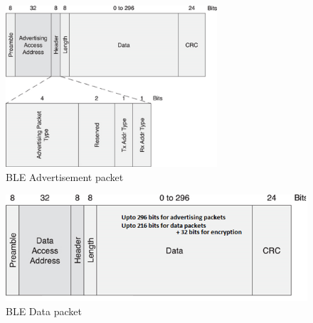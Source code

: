 \documentclass[]{article}
\begin{document}
\begin{figure}[htb]
	\begin{center}
		\includegraphics[width = 0.7\textwidth]{advertisement}
	\end{center}
	\caption{\ac{BLE} Advertisement packet}
	\label{fig:advertisement}
\end{figure}

\begin{figure}[htb]
	\begin{center}
		\includegraphics[width = 1\textwidth]{data}
	\end{center}
	\caption{\ac{BLE} Data packet}
	\label{fig:data}
\end{figure}
\end{document}
